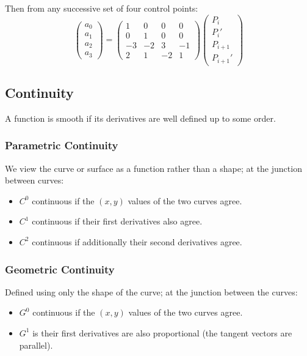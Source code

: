 \documentclass[11pt]{article}
\begin{document}
Then from any successive set of four control points:
\[
  \begin{pmatrix} a_0 \\ a_1 \\ a_2 \\ a_3 \end{pmatrix} =
  \begin{pmatrix}
    1 & 0 & 0 & 0 \\
    0 & 1 & 0 & 0 \\
    -3 & -2 & 3 & -1 \\
    2 & 1 & -2 & 1
  \end{pmatrix}
  \begin{pmatrix} P_i \\ P_i' \\ P_{i+1} \\ P_{i+1}' \end{pmatrix}
\]

\subsection{Continuity}
A function is smooth if its derivatives are well defined up to some order.

\subsubsection{Parametric Continuity}
We view the curve or surface as a function rather than a shape; at the junction between curves:
\begin{itemize}
  \item $C^0$ continuous if the $(x, y)$ values of the two curves agree.
  \item $C^1$ continuous if their first derivatives also agree.
  \item $C^2$ continuous if additionally their second derivatives agree.
\end{itemize}

\subsubsection{Geometric Continuity}
Defined using only the shape of the curve; at the junction between the curves:
\begin{itemize}
  \item $G^0$ continuous if the $(x, y)$ values of the two curves agree.
  \item $G^1$ is their first derivatives are also proportional (the tangent vectors are parallel).
\end{itemize}
\end{document}

